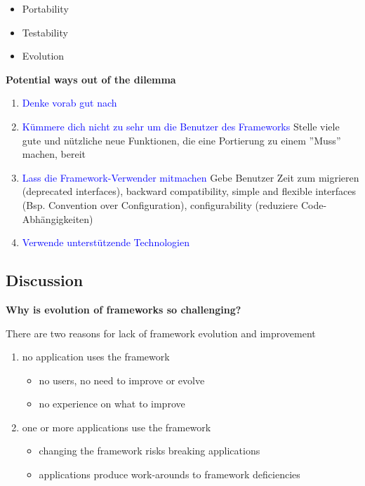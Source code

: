 \begin{itemize}
    \item Portability
    \item Testability
    \item Evolution
\end{itemize}
\vspace{10pt}
\textbf{Potential ways out of the dilemma}
\begin{enumerate}
    \item \textcolor{blue}{Denke vorab gut nach}
    \item \textcolor{blue}{Kümmere dich nicht zu sehr um die Benutzer des Frameworks} Stelle viele gute und nützliche neue Funktionen, die eine Portierung zu einem ''Muss'' machen, bereit
    \item \textcolor{blue}{Lass die Framework-Verwender mitmachen} Gebe Benutzer Zeit zum migrieren (deprecated interfaces), backward compatibility, simple and flexible interfaces (Bsp. Convention over Configuration), configurability (reduziere Code-Abhängigkeiten)
    \item \textcolor{blue}{Verwende unterstützende Technologien}
\end{enumerate}

\subsection{Discussion}

\textbf{Why is evolution of frameworks so challenging?}

There are two reasons for lack of framework evolution and improvement
\begin{enumerate}
    \item no application uses the framework
    \begin{itemize}
        \item no users, no need to improve or evolve
        \item no experience on what to improve
    \end{itemize}
    \item one or more applications use the framework
    \begin{itemize}
        \item changing the framework risks breaking applications
        \item applications produce work-arounds to framework deficiencies
    \end{itemize}
\end{enumerate}
